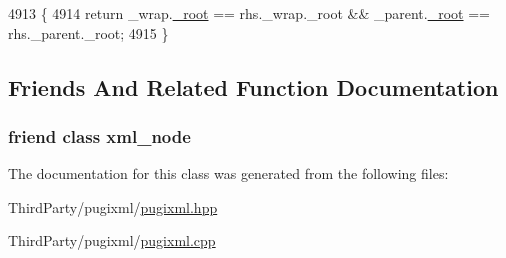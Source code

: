 \begin{DoxyCode}
4913     \{
4914         \textcolor{keywordflow}{return} \_wrap.\hyperlink{classpugi_1_1xml__node_a45a5b342de1e37a60565f7693f03cc08}{\_root} == rhs.\_wrap.\_root && \_parent.\hyperlink{classpugi_1_1xml__node_a45a5b342de1e37a60565f7693f03cc08}{\_root} == rhs.\_parent.\_root;
4915     \}
\end{DoxyCode}


\subsection{Friends And Related Function Documentation}
\hypertarget{classpugi_1_1xml__node__iterator_a156d917a92815c7b593bd5ef19f6d5fb}{
\subsubsection[{xml\-\_\-node}]{\setlength{\rightskip}{0pt plus 5cm}friend class {\bf xml\-\_\-node}\hspace{0.3cm}{\ttfamily [friend]}}}\label{classpugi_1_1xml__node__iterator_a156d917a92815c7b593bd5ef19f6d5fb}


The documentation for this class was generated from the following files\-:\begin{DoxyCompactItemize}
\item 
Third\-Party/pugixml/\hyperlink{pugixml_8hpp}{pugixml.\-hpp}\item 
Third\-Party/pugixml/\hyperlink{pugixml_8cpp}{pugixml.\-cpp}\end{DoxyCompactItemize}
